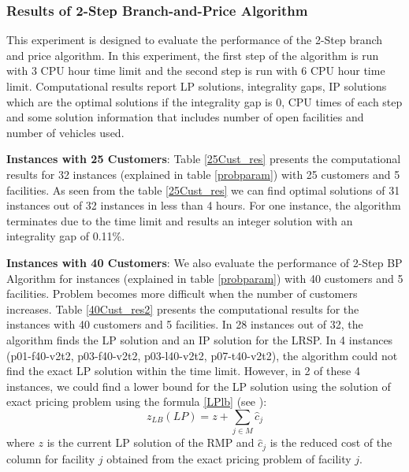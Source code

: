    
\subsubsection {Results of 2-Step Branch-and-Price Algorithm}

This experiment is designed to evaluate the performance of the 2-Step branch and price algorithm.
In this experiment, the first step of the algorithm
is run with 3 CPU hour time limit and the second step is run with 6 CPU hour time limit. Computational results
report LP solutions, integrality gaps, IP solutions which are the optimal solutions if the integrality gap is
0, CPU times of each step and some solution information that includes  number of open facilities and number 
of vehicles used. 
 
{\bf Instances with 25 Customers}: Table \ref{25Cust_res} presents the computational results for 32 instances 
(explained in table \ref{probparam}) with 25 customers and 5 facilities.  As seen from the table  
 \ref{25Cust_res} we can find optimal solutions of 31 instances out of 32 instances in less than 4 hours. 
For one instance, the algorithm terminates due to the time limit and results an integer 
solution with an integrality gap of 0.11\%. 


{\bf Instances with 40 Customers}:  
We also evaluate the performance of 2-Step BP Algorithm for instances (explained in table \ref{probparam}) with 40
customers and 5 facilities. Problem becomes more difficult when the number of customers increases. 
Table \ref{40Cust_res2} presents the computational results for the instances with 40 customers and 5 facilities. 
In 28 instances out of 32, the algorithm finds the LP solution and an IP solution for the LRSP. In 4 instances 
(p01-f40-v2t2, p03-f40-v2t2, p03-l40-v2t2, p07-t40-v2t2),
the algorithm could not find the exact LP solution within the time limit. However, in 2 of these 4 instances,
we could find a lower bound for the LP solution using the solution of exact pricing problem using the
formula \ref{LPlb} (see \citet{Lubbecke}):
\begin{equation}
z_{LB}(LP) = z + \sum_{j \in M}\hat{c}_j \label{LPlb}
\end{equation}
where $z$ is the current LP solution of the RMP and $\hat{c}_j$ is the reduced cost of the 
column for facility $j$ obtained from the exact pricing problem of facility $j$.

